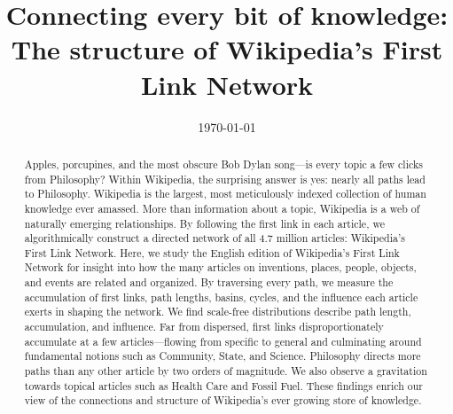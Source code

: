 \documentclass[pre,twocolumn,twoside,byrevtex,superscriptaddress,floatfix]{revtex4-1}
\begin{document}
\title{\protect
Connecting every bit of knowledge: \\
The structure of Wikipedia's First Link Network
}

\author{
}


\author{
}


\author{
}



\date{\today}

\begin{abstract}
  \protect
  Apples, porcupines, and the most obscure Bob Dylan song---is every topic a few clicks from Philosophy? 
Within Wikipedia, the surprising answer is yes: nearly all 
paths lead to Philosophy.
Wikipedia is the largest, most meticulously indexed collection of human knowledge ever amassed. 
More than information about a topic, Wikipedia is a web of naturally emerging relationships.  
By following the first link in each article, we algorithmically construct a directed network of 
all 4.7 million articles: Wikipedia's First Link Network.
Here, we study the English edition of Wikipedia's First Link Network for insight into how the many 
articles on inventions, places, people, objects, and events are related and organized.  
By traversing every path, we measure the accumulation of first links, path lengths, basins, cycles, 
and the influence each article exerts in shaping the network.
We find scale-free distributions describe path length, 
accumulation, and influence. Far from dispersed, first links disproportionately accumulate 
at a few articles---flowing from specific to general and culminating around fundamental notions such as
Community, State, and Science. 
Philosophy directs more paths than any other article by two orders of magnitude. 
We also observe a gravitation towards topical articles such as 
Health Care and Fossil Fuel. 
These findings enrich our view of the connections and structure of
Wikipedia's ever growing store of knowledge.

 
\end{abstract}
\end{document}
